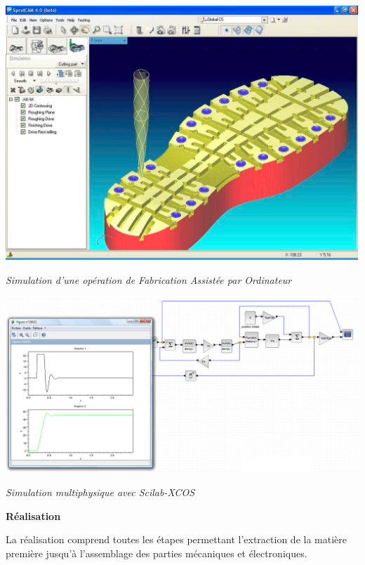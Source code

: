 \documentclass[11pt,oneside]{article}
\begin{document}
\begin{exemple}
\noindent\begin{minipage}[c]{.35\linewidth}
\begin{center}
\includegraphics[width=\textwidth]{png/FAO}

\textit{Simulation d'une opération de Fabrication Assistée par Ordinateur}\cite{fao}
\end{center}
\end{minipage} \hfill
\begin{minipage}[c]{.55\linewidth}
\begin{center}
\includegraphics[width=\textwidth]{png/scilab}

\textit{Simulation multiphysique avec Scilab-XCOS}\cite{scilab}
\end{center}
\end{minipage} 
\end{exemple}

\begin{defi}
\textbf{Réalisation}

La réalisation comprend toutes les étapes permettant l'extraction de la matière première jusqu'à l'assemblage des parties mécaniques et électroniques. 
\end{defi}
\end{document}
